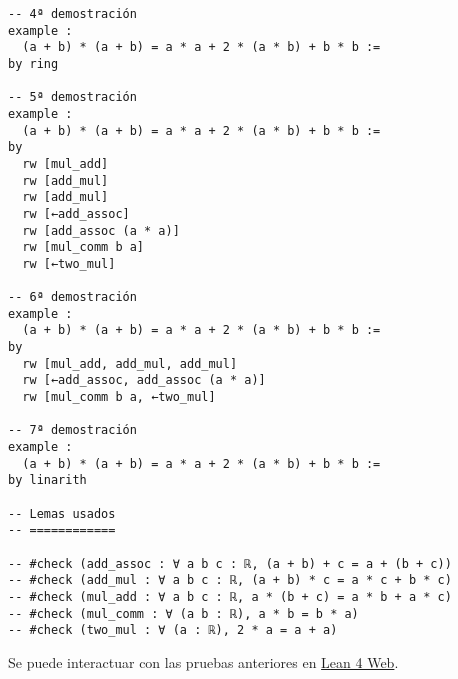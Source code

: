 \begin{verbatim}
-- 4ª demostración
example :
  (a + b) * (a + b) = a * a + 2 * (a * b) + b * b :=
by ring

-- 5ª demostración
example :
  (a + b) * (a + b) = a * a + 2 * (a * b) + b * b :=
by
  rw [mul_add]
  rw [add_mul]
  rw [add_mul]
  rw [←add_assoc]
  rw [add_assoc (a * a)]
  rw [mul_comm b a]
  rw [←two_mul]

-- 6ª demostración
example :
  (a + b) * (a + b) = a * a + 2 * (a * b) + b * b :=
by
  rw [mul_add, add_mul, add_mul]
  rw [←add_assoc, add_assoc (a * a)]
  rw [mul_comm b a, ←two_mul]

-- 7ª demostración
example :
  (a + b) * (a + b) = a * a + 2 * (a * b) + b * b :=
by linarith

-- Lemas usados
-- ============

-- #check (add_assoc : ∀ a b c : ℝ, (a + b) + c = a + (b + c))
-- #check (add_mul : ∀ a b c : ℝ, (a + b) * c = a * c + b * c)
-- #check (mul_add : ∀ a b c : ℝ, a * (b + c) = a * b + a * c)
-- #check (mul_comm : ∀ (a b : ℝ), a * b = b * a)
-- #check (two_mul : ∀ (a : ℝ), 2 * a = a + a)
\end{verbatim}
Se puede interactuar con las pruebas anteriores en \href{https://lean.math.hhu.de/\#url=https://raw.githubusercontent.com/jaalonso/Calculemus2/main/src/(a+b)(a+b)\_eq\_aa+2ab+bb.lean}{Lean 4 Web}.

